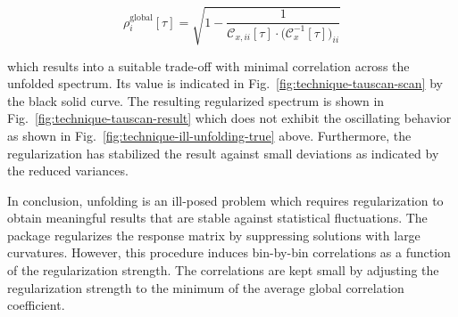 \begin{equation}
\rho^\mathrm{global}_{ i}[\tau]=\sqrt{1-\frac{1}{\mathcal{C}_{x,ii}[\tau]\cdot\big(\mathcal{C}_{x}^{-1}[\tau]\big)_{ii}}}\label{eq:technique-global-correlation}
\end{equation}

which results into a suitable trade-off with minimal correlation across the unfolded spectrum. Its value is indicated in Fig.~\ref{fig:technique-tauscan-scan} by the black solid curve. The resulting regularized spectrum is shown in Fig.~\ref{fig:technique-tauscan-result} which does not exhibit the oscillating behavior as shown in Fig.~\ref{fig:technique-ill-unfolding-true} above. Furthermore, the regularization has stabilized the result against small deviations as indicated by the reduced variances.


In conclusion, unfolding is an ill-posed problem which requires regularization to obtain meaningful results that are stable against statistical fluctuations. The \TUNFOLD package regularizes the response matrix by suppressing solutions with large curvatures. However, this procedure induces bin-by-bin correlations as a function of the regularization strength. The correlations are kept small by adjusting the regularization strength to the minimum of the average global correlation coefficient.

